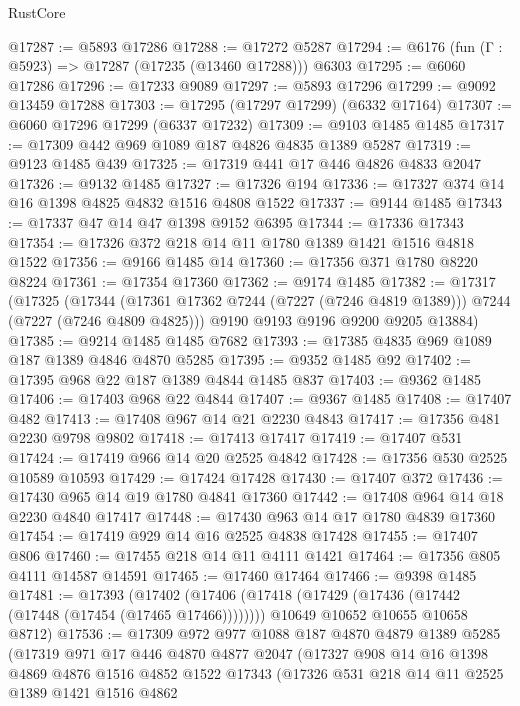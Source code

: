 \begin{lexlean}{RustCore}
\begin{coremodule}
@17287 := @5893 @17286
@17288 := @17272 @5287
@17294 := @6176 (fun (Γ : @5923) => @17287 (@17235 (@13460 @17288))) @6303
@17295 := @6060 @17286
@17296 := @17233 @9089
@17297 := @5893 @17296
@17299 := @9092 @13459 @17288
@17303 := @17295 (@17297 @17299) (@6332 @17164)
@17307 := @6060 @17296 @17299 (@6337 @17232)
@17309 := @9103 @1485 @1485
@17317 := @17309 @442 @969 @1089 @187 @4826 @4835 @1389 @5287
@17319 := @9123 @1485 @439
@17325 := @17319 @441 @17 @446 @4826 @4833 @2047
@17326 := @9132 @1485
@17327 := @17326 @194
@17336 := @17327 @374 @14 @16 @1398 @4825 @4832 @1516 @4808 @1522
@17337 := @9144 @1485
@17343 := @17337 @47 @14 @47 @1398 @9152 @6395
@17344 := @17336 @17343
@17354 := @17326 @372 @218 @14 @11 @1780 @1389 @1421 @1516 @4818 @1522
@17356 := @9166 @1485 @14
@17360 := @17356 @371 @1780 @8220 @8224
@17361 := @17354 @17360
@17362 := @9174 @1485
@17382 := @17317
    (@17325
      (@17344 (@17361 @17362 @7244 (@7227 (@7246 @4819 @1389))) @7244 (@7227 (@7246 @4809 @4825)))
      @9190
      @9193
      @9196
      @9200
      @9205
      @13884)
@17385 := @9214 @1485 @1485 @7682
@17393 := @17385 @4835 @969 @1089 @187 @1389 @4846 @4870 @5285
@17395 := @9352 @1485 @92
@17402 := @17395 @968 @22 @187 @1389 @4844 @1485 @837
@17403 := @9362 @1485
@17406 := @17403 @968 @22 @4844
@17407 := @9367 @1485
@17408 := @17407 @482
@17413 := @17408 @967 @14 @21 @2230 @4843
@17417 := @17356 @481 @2230 @9798 @9802
@17418 := @17413 @17417
@17419 := @17407 @531
@17424 := @17419 @966 @14 @20 @2525 @4842
@17428 := @17356 @530 @2525 @10589 @10593
@17429 := @17424 @17428
@17430 := @17407 @372
@17436 := @17430 @965 @14 @19 @1780 @4841 @17360
@17442 := @17408 @964 @14 @18 @2230 @4840 @17417
@17448 := @17430 @963 @14 @17 @1780 @4839 @17360
@17454 := @17419 @929 @14 @16 @2525 @4838 @17428
@17455 := @17407 @806
@17460 := @17455 @218 @14 @11 @4111 @1421
@17464 := @17356 @805 @4111 @14587 @14591
@17465 := @17460 @17464
@17466 := @9398 @1485
@17481 := @17393
    (@17402
      (@17406 (@17418 (@17429 (@17436 (@17442 (@17448 (@17454 (@17465 @17466))))))))
      @10649
      @10652
      @10655
      @10658
      @8712)
@17536 := @17309
    @972
    @977
    @1088
    @187
    @4870
    @4879
    @1389
    @5285
    (@17319
      @971
      @17
      @446
      @4870
      @4877
      @2047
      (@17327
        @908
        @14
        @16
        @1398
        @4869
        @4876
        @1516
        @4852
        @1522
        @17343
        (@17326
          @531
          @218
          @14
          @11
          @2525
          @1389
          @1421
          @1516
          @4862

\end{coremodule}
\end{lexlean}
